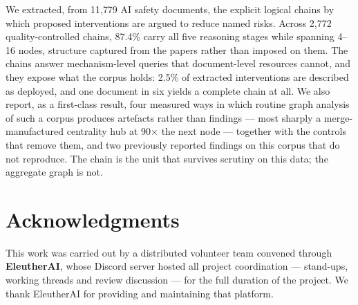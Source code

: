 \documentclass[10pt,twocolumn,letterpaper]{article}
\begin{document}
We extracted, from 11{,}779 AI safety documents, the explicit logical chains by which
proposed interventions are argued to reduce named risks. Across 2{,}772
quality-controlled chains, 87.4\% carry all five reasoning stages while spanning 4--16
nodes, structure captured from the papers rather than imposed on them. The chains answer
mechanism-level queries that document-level resources cannot, and they expose what the
corpus holds: 2.5\% of extracted interventions are described as deployed, and one
document in six yields a complete chain at all. We also report, as a first-class result,
four measured ways in which routine graph analysis of such a corpus produces artefacts
rather than findings --- most sharply a merge-manufactured centrality hub at 90$\times$
the next node --- together with the controls that remove them, and two previously
reported findings on this corpus that do not reproduce. The chain is the unit that
survives scrutiny on this data; the aggregate graph is not.

\section*{Acknowledgments}

This work was carried out by a distributed volunteer team convened through
\textbf{EleutherAI}, whose Discord server hosted all project coordination --- stand-ups,
working threads and review discussion --- for the full duration of the project. We thank
EleutherAI for providing and maintaining that platform.

%
%
%
%
%
\end{document}
